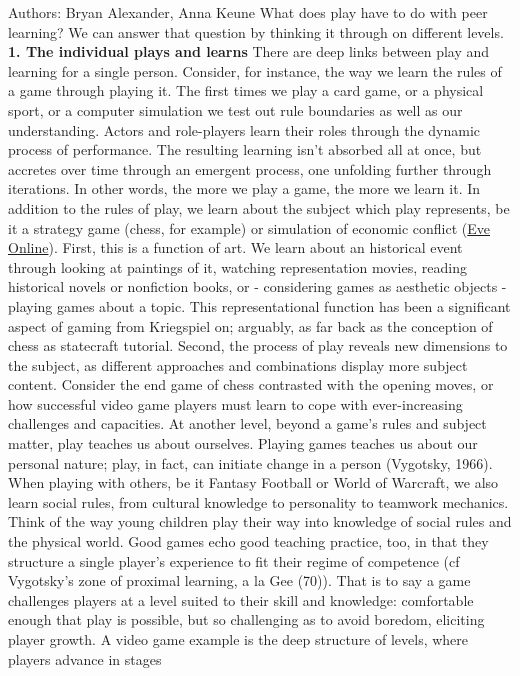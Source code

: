 Authors: Bryan Alexander, Anna Keune What does play have to do with peer
learning? We can answer that question by thinking it through on
different levels. \textbf{1. The individual plays and learns} There are
deep links between play and learning for a single person. Consider, for
instance, the way we learn the rules of a game through playing it. The
first times we play a card game, or a physical sport, or a computer
simulation we test out rule boundaries as well as our understanding.
Actors and role-players learn their roles through the dynamic process of
performance. The resulting learning isn't absorbed all at once, but
accretes over time through an emergent process, one unfolding further
through iterations. In other words, the more we play a game, the more we
learn it. In addition to the rules of play, we learn about the subject
which play represents, be it a strategy game (chess, for example) or
simulation of economic conflict (\href{http://www.eveonline.com/}{Eve
Online}). First, this is a function of art. We learn about an historical
event through looking at paintings of it, watching representation
movies, reading historical novels or nonfiction books, or - considering
games as aesthetic objects - playing games about a topic. This
representational function has been a significant aspect of gaming from
Kriegspiel on; arguably, as far back as the conception of chess as
statecraft tutorial. Second, the process of play reveals new dimensions
to the subject, as different approaches and combinations display more
subject content. Consider the end game of chess contrasted with the
opening moves, or how successful video game players must learn to cope
with ever-increasing challenges and capacities. At another level, beyond
a game's rules and subject matter, play teaches us about ourselves.
Playing games teaches us about our personal nature; play, in fact, can
initiate change in a person (Vygotsky, 1966). When playing with others,
be it Fantasy Football or World of Warcraft, we also learn social rules,
from cultural knowledge to personality to teamwork mechanics. Think of
the way young children play their way into knowledge of social rules and
the physical world. Good games echo good teaching practice, too, in that
they structure a single player's experience to fit their regime of
competence (cf Vygotsky's zone of proximal learning, a la Gee (70)).
That is to say a game challenges players at a level suited to their
skill and knowledge: comfortable enough that play is possible, but so
challenging as to avoid boredom, eliciting player growth. A video game
example is the deep structure of levels, where players advance in stages
